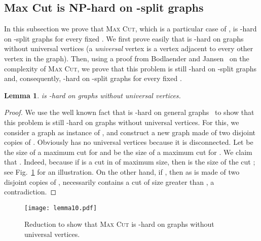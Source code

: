 \documentclass[
final
]{dmtcs-episciences}
\newtheorem{lemma}{Lemma}{\bfseries}{\itshape}
\begin{document}
\subsection{Max Cut is NP-hard on -split graphs}
\label{ap:NP-hard}

In this subsection we prove that \textsc{Max Cut}, which is a particular case of {}, is {}-hard on -split graphs for every fixed .
We first prove easily that {} is {}-hard on
graphs without universal vertices (a \emph{universal} vertex is a vertex adjacent to every other vertex in the graph). Then, using a proof  from Bodlaender and Jansen~\cite{bodlaender} on the complexity of \textsc{Max Cut}, we prove that this problem is still {}-hard on -split graphs and, consequently, {}-hard on -split graphs for every fixed .






\begin{lemma}\label{lemma4.3}
{} is {}-hard on graphs without universal vertices.		
\end{lemma}
\begin{proof}
We use the well known fact that {} is {}-hard on general graphs~\cite{garey1976some} to show that this problem is still {}-hard on graphs without universal vertices. For this, we consider a graph  as instance of  {}, and construct a new graph  made of two disjoint copies of . Obviously  has no universal vertices because it is disconnected.
Let  be the size of a maximum cut for  and  be the size of a maximum cut for . We claim that . Indeed,  because if  is a cut in  of maximum size, then  is the size of the cut ; see Fig.~\ref{fig:no-universal-vertices} for an illustration. On the other hand, if , then as  is made of two disjoint copies of , necessarily  contains a cut of size greater than , a contradiction.
\end{proof}

\begin{figure}[h]
\vspace{-1.2cm}
\begin{center}
 \texttt{[image: lemma10.pdf]}
\vspace{-.35cm}\caption{Reduction to show that \textsc{Max Cut} is {}-hard on graphs without universal vertices.} \label{fig:no-universal-vertices}\vspace{-.2cm}
\end{center}
\end{figure}
\end{document}
